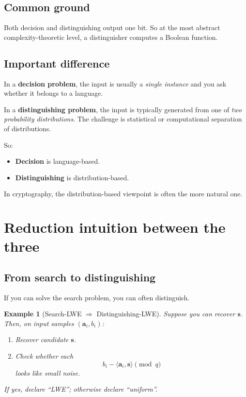 \documentclass[11pt]{article}
\newtheorem{example}{Example}
\begin{document}
	\subsection{Common ground}
	
	Both decision and distinguishing output one bit. So at the most abstract complexity-theoretic level, a distinguisher computes a Boolean function.
	
	\subsection{Important difference}
	
	In a \textbf{decision problem}, the input is usually a \emph{single instance} and you ask whether it belongs to a language.
	
	In a \textbf{distinguishing problem}, the input is typically generated from one of \emph{two probability distributions}. The challenge is statistical or computational separation of distributions.
	
	\medskip
	
	\noindent
	So:
	
	\begin{itemize}
		\item \textbf{Decision} is language-based.
		\item \textbf{Distinguishing} is distribution-based.
	\end{itemize}
	
	\noindent
	In cryptography, the distribution-based viewpoint is often the more natural one.
	
	\section{Reduction intuition between the three}
	
	\subsection{From search to distinguishing}
	
	If you can solve the search problem, you can often distinguish.
	
	\begin{example}[Search-LWE $\Rightarrow$ Distinguishing-LWE]
		Suppose you can recover $\bm s$. Then, on input samples $(\bm a_i,b_i)$:
		\begin{enumerate}
			\item Recover candidate $\bm s$.
			\item Check whether each
			\[
			b_i - \langle \bm a_i,\bm s\rangle \pmod q
			\]
			looks like small noise.
		\end{enumerate}
		If yes, declare ``LWE''; otherwise declare ``uniform''.
	\end{example}
	
\end{document}
